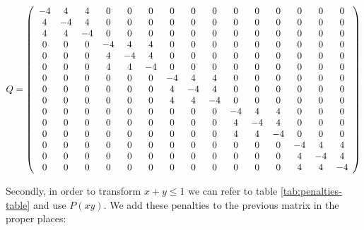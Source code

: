 $$
Q = 
\left(
\begin{array}{*{15}c}
	-4 & 4 & 4 & 0 & 0 & 0 & 0 & 0 & 0 & 0 & 0 & 0 & 0 & 0 & 0 \\
	4 & -4 & 4 & 0 & 0 & 0 & 0 & 0 & 0 & 0 & 0 & 0 & 0 & 0 & 0 \\
	4 & 4 & -4 & 0 & 0 & 0 & 0 & 0 & 0 & 0 & 0 & 0 & 0 & 0 & 0 \\
	0 & 0 & 0 & -4 & 4 & 4 & 0 & 0 & 0 & 0 & 0 & 0 & 0 & 0 & 0 \\
	0 & 0 & 0 & 4 & -4 & 4 & 0 & 0 & 0 & 0 & 0 & 0 & 0 & 0 & 0 \\
	0 & 0 & 0 & 4 & 4 & -4 & 0 & 0 & 0 & 0 & 0 & 0 & 0 & 0 & 0 \\
	0 & 0 & 0 & 0 & 0 & 0 & -4 & 4 & 4 & 0 & 0 & 0 & 0 & 0 & 0 \\
	0 & 0 & 0 & 0 & 0 & 0 & 4 & -4 & 4 & 0 & 0 & 0 & 0 & 0 & 0 \\
	0 & 0 & 0 & 0 & 0 & 0 & 4 & 4 & -4 & 0 & 0 & 0 & 0 & 0 & 0 \\
	0 & 0 & 0 & 0 & 0 & 0 & 0 & 0 & 0 & -4 & 4 & 4 & 0 & 0 & 0 \\
	0 & 0 & 0 & 0 & 0 & 0 & 0 & 0 & 0 & 4 & -4 & 4 & 0 & 0 & 0 \\
	0 & 0 & 0 & 0 & 0 & 0 & 0 & 0 & 0 & 4 & 4 & -4 & 0 & 0 & 0 \\
	0 & 0 & 0 & 0 & 0 & 0 & 0 & 0 & 0 & 0 & 0 & 0 & -4 & 4 & 4 \\
	0 & 0 & 0 & 0 & 0 & 0 & 0 & 0 & 0 & 0 & 0 & 0 & 4 & -4 & 4 \\
	0 & 0 & 0 & 0 & 0 & 0 & 0 & 0 & 0 & 0 & 0 & 0 & 4 & 4 & -4 
\end{array}
\right)
$$

Secondly, in order to transform $x + y \leq 1$ we can refer to table \ref{tab:penalties-table} and use $P(xy)$. We add these penalties to the previous matrix in the proper places:

